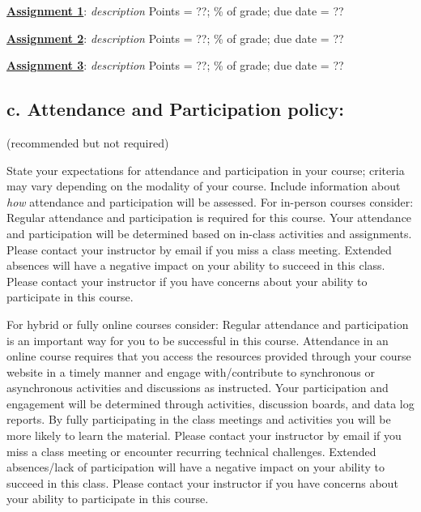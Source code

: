 \documentclass[12pt]{article}
\begin{document}
\textbf{\uline{Assignment 1}}: \emph{description} Points = ??; \% of grade; due date = ??

\textbf{\uline{Assignment 2}}: \emph{description} Points = ??; \% of grade; due date = ??

\textbf{\uline{Assignment 3}}: \emph{description} Points = ??; \% of grade; due date = ??

\subsection*{c. Attendance and Participation policy:} {\color{annotationblue}(recommended but not required)}

{\color{annotationblue}State your expectations for attendance and participation in your course; criteria may vary depending on the modality of your course. Include information about \emph{how} attendance and participation will be assessed.} {\color{suggestionred}For in-person courses consider: Regular attendance and participation is required for this course. Your attendance and participation will be determined based on in-class activities and assignments. Please contact your instructor by email if you miss a class meeting. Extended absences will have a negative impact on your ability to succeed in this class. Please contact your instructor if you have concerns about your ability to participate in this course.}

{\color{suggestionred}For hybrid or fully online courses consider: Regular attendance and participation is an important way for you to be successful in this course. Attendance in an online course requires that you access the resources provided through your course website in a timely manner and engage with/contribute to synchronous or asynchronous activities and discussions as instructed. Your participation and engagement will be determined through activities, discussion boards, and data log reports. By fully participating in the class meetings and activities you will be more likely to learn the material. Please contact your instructor by email if you miss a class meeting or encounter recurring technical challenges. Extended absences/lack of participation will have a negative impact on your ability to succeed in this class. Please contact your instructor if you have concerns about your ability to participate in this course.}
\end{document}
